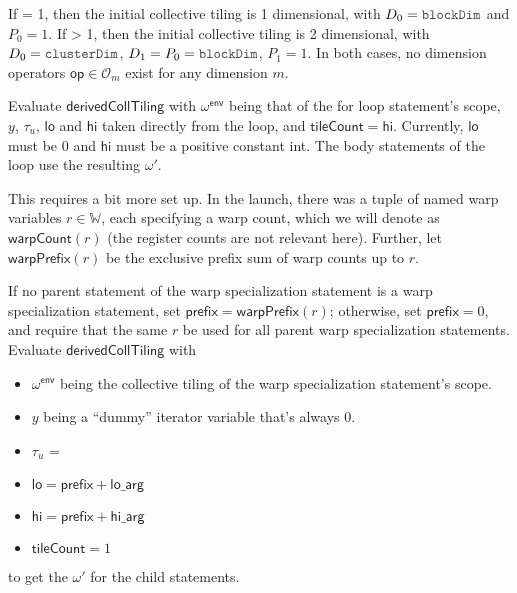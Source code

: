 \filbreak
{}

If  = 1, then the initial collective tiling is 1 dimensional, with $D_0 = \lighttt{blockDim}$ and $P_0 = 1$.
If  > 1, then the initial collective tiling is 2 dimensional, with $D_0 = \lighttt{clusterDim}$, $D_1 = P_0 = \lighttt{blockDim}$, $P_1 = 1$.
In both cases, no dimension operators $\mathsf{op} \in \mathcal{O}_m$ exist for any dimension $m$.

\filbreak
{}

Evaluate $\mathsf{derivedCollTiling}$ with $\mathsf{\omega^{env}}$ being that of the for loop statement's scope, $y$, $\tau_u$, $\mathsf{lo}$ and $\mathsf{hi}$ taken directly from the loop, and $\mathsf{tileCount} = \mathsf{hi}$.
Currently, $\mathsf{lo}$ must be 0 and $\mathsf{hi}$ must be a positive constant int.
The body statements of the loop use the resulting $\omega'$.

\filbreak
{}

This requires a bit more set up.
In the  launch, there was a tuple of named warp variables $r \in \mathbb{W}$, each specifying a warp count, which we will denote as $\mathsf{warpCount}(r)$ (the register counts are not relevant here).
Further, let $\mathsf{warpPrefix}(r)$ be the exclusive prefix sum of warp counts up to $r$.

\filbreak
If no parent statement of the warp specialization statement is a warp specialization statement, set $\mathsf{prefix} = \mathsf{warpPrefix}(r)$; otherwise, set $\mathsf{prefix}=0$, and require that the same $r$ be used for all parent warp specialization statements.
Evaluate $\mathsf{derivedCollTiling}$ with
\begin{itemize}
  \item $\mathsf{\omega^{env}}$ being the collective tiling of the warp specialization statement's scope.
  \filbreak
  \item $y$ being a ``dummy'' iterator variable that's always 0.
  \filbreak
  \item $\tau_u$ = 
  \filbreak
  \item $\mathsf{lo} = \mathsf{prefix} + \mathsf{lo\_arg}$
  \filbreak
  \item $\mathsf{hi} = \mathsf{prefix} + \mathsf{hi\_arg}$
  \filbreak
  \item $\mathsf{tileCount} = 1$
\end{itemize}
to get the $\omega'$ for the child statements.

